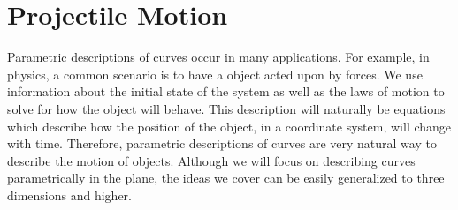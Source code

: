 \documentclass{ximera}
\begin{document}
\section{Projectile Motion}

Parametric descriptions of curves occur in many applications. For example, in physics, a common scenario is to have a object acted upon by forces. We use information about the initial state of the system as well as the laws of motion to solve for how the object will behave. This description will naturally be equations which describe how the position of the object, in a coordinate system, will change with time. Therefore, parametric descriptions of curves are very natural way to describe the motion of objects. Although we will focus on describing curves parametrically in the plane, the ideas we cover can be easily generalized to three dimensions and higher.
\end{document}
